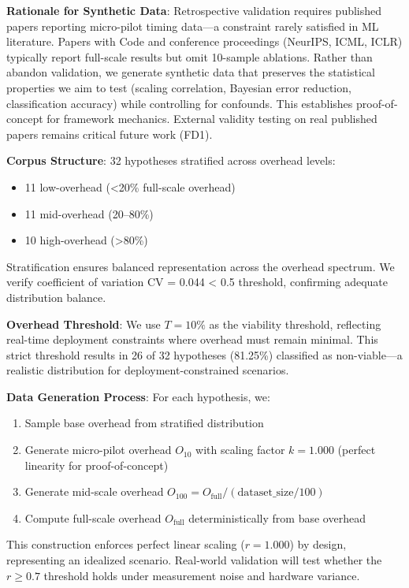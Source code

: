 \textbf{Rationale for Synthetic Data}: Retrospective validation requires published papers reporting micro-pilot timing data---a constraint rarely satisfied in ML literature. Papers with Code and conference proceedings (NeurIPS, ICML, ICLR) typically report full-scale results but omit 10-sample ablations. Rather than abandon validation, we generate synthetic data that preserves the statistical properties we aim to test (scaling correlation, Bayesian error reduction, classification accuracy) while controlling for confounds. This establishes proof-of-concept for framework mechanics. External validity testing on real published papers remains critical future work (FD1).

\textbf{Corpus Structure}: 32 hypotheses stratified across overhead levels:
\begin{itemize}
\item 11 low-overhead (<20\% full-scale overhead)
\item 11 mid-overhead (20--80\%)
\item 10 high-overhead (>80\%)
\end{itemize}

Stratification ensures balanced representation across the overhead spectrum. We verify coefficient of variation CV = 0.044 < 0.5 threshold, confirming adequate distribution balance.

\textbf{Overhead Threshold}: We use $T = 10\%$ as the viability threshold, reflecting real-time deployment constraints where overhead must remain minimal. This strict threshold results in 26 of 32 hypotheses (81.25\%) classified as non-viable---a realistic distribution for deployment-constrained scenarios.

\textbf{Data Generation Process}: For each hypothesis, we:
\begin{enumerate}
\item Sample base overhead from stratified distribution
\item Generate micro-pilot overhead $O_{10}$ with scaling factor $k=1.000$ (perfect linearity for proof-of-concept)
\item Generate mid-scale overhead $O_{100} = O_{\text{full}} / (\text{dataset\_size} / 100)$
\item Compute full-scale overhead $O_{\text{full}}$ deterministically from base overhead
\end{enumerate}

This construction enforces perfect linear scaling ($r=1.000$) by design, representing an idealized scenario. Real-world validation will test whether the $r \geq 0.7$ threshold holds under measurement noise and hardware variance.

